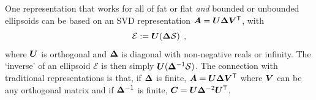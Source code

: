 One representation that works for all of fat or flat \emph{and} bounded or unbounded ellipsoids can be based on an SVD representation
$\bm{A}  = \bm{U} \bm{\Delta} \bm{V}^\mathsf{T}$, with
\begin{equation}
 \mathcal{E} := \bm{U} (\bm{\Delta} \mathcal{S}) \:\: ,
\end{equation}
where $\bm{U}$ is orthogonal and $\bm{\Delta}$ is diagonal with non-negative reals or infinity.
The `inverse' of an ellipsoid $\mathcal{E}$ is then simply $\bm{U} (\bm{\Delta}^{-1} \mathcal{S})$.
The connection with traditional representations is that,
if $\bm{\Delta}$ is finite,
$\bm{A}  = \bm{U} \bm{\Delta} \bm{V}^\mathsf{T}$
where $\bm{V}$ can be any orthogonal matrix and
if $\bm{\Delta}^{-1}$ is finite, $\bm{C} = \bm{U} \bm{\Delta}^{-2} \bm{U}^\mathsf{T}$.


